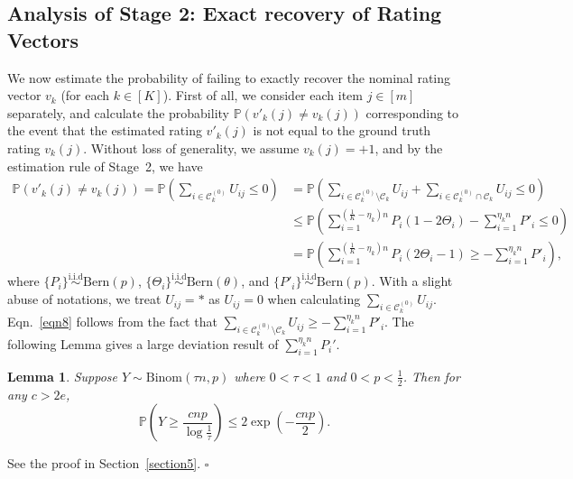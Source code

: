 \documentclass{article}
\newtheorem{lemma}{Lemma}
\newenvironment{proof}{{\noindent\it Proof:}\quad}{\hfill $\square$\par}
\begin{document}
\subsection{Analysis of Stage 2: Exact recovery of Rating Vectors}
We now estimate the probability of failing to exactly recover the nominal rating vector $v_k$ (for each $k \in [K]$). First of all, we consider each item $j\in [m]$ separately, and  calculate the probability $\mathbb{P} (v'_k(j) \neq v_k(j))$ corresponding to the event that the estimated rating $v'_k(j)$ is not equal to the ground truth rating $v_k(j)$. Without loss of generality, we assume $v_k(j)=+1$, and by the estimation rule of Stage~2, we have
\begin{align}
   \mathbb{P} (v'_k(j) \neq v_k(j)) =  \mathbb{P} \left( \sum_{i \in \mathcal{C}^{(0)}_k  } U_{ij} \leq 0 \right) & = \mathbb{P} \left( \sum_{i \in \mathcal{C}^{(0)}_k \setminus \mathcal{C}_k } U_{ij} + \sum_{i \in \mathcal{C}^{(0)}_k \cap \mathcal{C}_k } U_{ij} \leq 0 \right) \\
    & \leq \mathbb{P} \left( \sum_{i=1}^{(\frac{1}{K} - \eta_k)n} P_i (1-2\Theta_i) - \sum_{i=1}^{\eta_k n} P'_i \leq 0 \right) \label{eqn8} \\
    & = \mathbb{P} \left( \sum_{i=1}^{(\frac{1}{K} - \eta_k)n} P_i (2\Theta_i - 1)  \geq -\sum_{i=1}^{\eta_k n} P'_i \right), \label{eqn9}
\end{align}
where $\{P_i\} \overset{\text{i.i.d}}{\sim} \text{Bern}(p)$, $\{\Theta_i\} \overset{\text{i.i.d}}{\sim} \text{Bern}(\theta) $, and $\{P'_i\} \overset{\text{i.i.d}}{\sim} \text{Bern}(p)$.  With a slight abuse of notations, we treat  $U_{ij} = *$ as $U_{ij} = 0$ when calculating $\sum_{i \in \mathcal{C}^{(0)}_k } U_{ij}$.   Eqn.~\eqref{eqn8} follows from the fact that $\sum_{i \in \mathcal{C}^{(0)}_k \setminus \mathcal{C}_k } U_{ij} \geq -\sum_{i=1}^{\eta_k n} P'_i$. The following Lemma gives a large deviation result of $\sum_{i=1}^{\eta_k n} P_i'$.

\begin{lemma}\label{lemma4}
	Suppose $Y \sim \text{Binom}(\tau n, p) $ where $0 < \tau < 1$ and $0<p<\frac{1}{2}$. Then for any $c > 2e$, 
	$$
	\mathbb{P}\left( Y \geq \frac{cnp}{\log \frac{1}{\tau}} \right) \leq 2 \exp \left( -\frac{cnp}{2} \right).
	$$ 
\end{lemma}

\begin{proof}
    See the proof in Section~\ref{section5}.
\end{proof}
\end{document}
